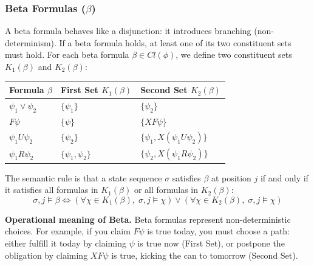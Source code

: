\subsubsection{Beta Formulas ($\beta$)}
A beta formula behaves like a disjunction: it introduces branching (non-determinism). If a beta formula holds, at least one of its two constituent sets must hold.
For each beta formula $\beta \in Cl(\phi)$, we define two constituent sets $K_1(\beta)$ and $K_2(\beta)$:
\begin{center}
\renewcommand{\arraystretch}{1.2}
\begin{tabular}{l|l|l}
Formula $\beta$ & First Set $K_1(\beta)$ & Second Set $K_2(\beta)$ \\
\hline
$\psi_1 \lor \psi_2$ & $\{\psi_1\}$ & $\{\psi_2\}$ \\
$F \psi$ & $\{\psi\}$ & $\{X F \psi\}$ \\
$\psi_1 U \psi_2$ & $\{\psi_2\}$ & $\{\psi_1, X(\psi_1 U \psi_2)\}$ \\
$\psi_1 R \psi_2$ & $\{\psi_1, \psi_2\}$ & $\{\psi_2, X(\psi_1 R \psi_2)\}$ \\
\end{tabular}
\end{center}
The semantic rule is that a state sequence $\sigma$ satisfies $\beta$ at position $j$ if and only if it satisfies all formulas in $K_1(\beta)$ or all formulas in $K_2(\beta)$:
\[
  \sigma, j \models \beta \iff \left( \forall \chi \in K_1(\beta), \; \sigma, j \models \chi \right) \lor \left( \forall \chi \in K_2(\beta), \; \sigma, j \models \chi \right)
\]

\medskip\noindent
\textbf{Operational meaning of Beta.} Beta formulas represent non-deterministic choices. For example, if you claim $F \psi$ is true today, you must choose a path: either fulfill it today by claiming $\psi$ is true now (First Set), or postpone the obligation by claiming $X F \psi$ is true, kicking the can to tomorrow (Second Set).

